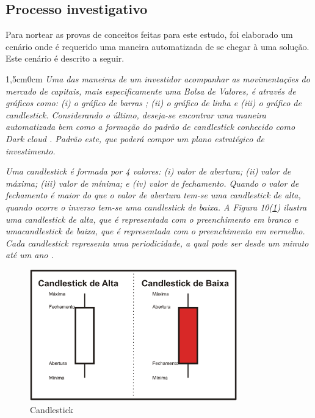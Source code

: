 \subsection{Processo investigativo}

Para nortear as provas de conceitos feitas para este estudo, foi elaborado um cenário onde é requerido uma maneira automatizada de se chegar à uma solução. Este cenário é descrito a seguir.

\begin{adjustwidth}{1,5cm}{0cm}
\textit{Uma das maneiras de um investidor acompanhar as movimentações do mercado de capitais, mais especificamente uma Bolsa de Valores, é através de gráficos como: (i) o gráfico de barras ; (ii) o gráfico de linha  e (iii) o gráfico de candlestick\cite[p. 5-6]{matsura2006}. Considerando o último, deseja-se encontrar uma maneira automatizada bem como a formação do padrão de candlestick conhecido como Dark cloud \cite[p.61]{matsura2006}. Padrão este, que poderá compor um plano estratégico de investimento.}

\textit{Uma candlestick é formada por 4 valores: (i) valor de abertura; (ii) valor de máxima; (iii) valor de mínima; e (iv) valor de fechamento. Quando o valor de  fechamento é maior do que o valor de abertura tem-se uma candlestick de alta, quando ocorre o inverso tem-se uma candlestick de baixa. A Figura 10(\ref{f10}) ilustra uma candlestick de alta, que é representada com o preenchimento em branco e umacandlestick de baixa, que é representada com o preenchimento em vermelho. Cada candlestick representa uma periodicidade, a qual pode ser desde um minuto até um ano \cite[p.6]{matsura2006}.}
\end{adjustwidth}

\begin{figure}[h]
\centering
\label{f10}
\includegraphics[width=0.8\textwidth]{figuras/f10}
\caption{Candlestick }

\end{figure}

